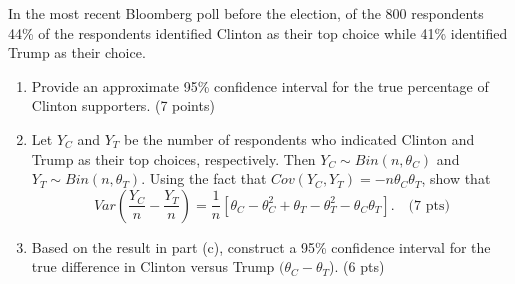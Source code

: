 

\item In the most recent Bloomberg poll before the election, of the 800 
respondents 44\% of the respondents identified Clinton as their top choice 
while 41\% identified Trump as their choice. 

\begin{enumerate}
\item Provide an approximate 95\% confidence interval for the true percentage of 
Clinton supporters. (7 points)

\vfill
% 
% 

\item Let $Y_C$ and $Y_T$ be the number of respondents who indicated Clinton 
and Trump as their top choices, respectively. Then $Y_C \sim Bin(n,\theta_C)$ 
and $Y_T \sim Bin(n,\theta_T)$. Using the fact that 
$Cov(Y_C,Y_T) = -n\theta_C \theta_T$, show that 
\[
Var\left( \frac{Y_C}{n} - \frac{Y_T}{n}\right) = 
\frac{1}{n}\left[ \theta_C - \theta_C^2 + \theta_T-\theta_T^2 - \theta_C\theta_T \right]. \quad \mbox{(7 pts)}
\]


\vfill

\item Based on the result in part (c), construct a 95\% confidence interval for 
the true difference in Clinton versus Trump $(\theta_C-\theta_T$). (6 pts)

\ansfont{
\[ 
\hat{\theta}_C - \hat{\theta}_T \pm z_{a/2} \sqrt{\frac{1}{n}\left[ \hat\theta_C - \hat\theta_C^2 + \hat\theta_T-\hat\theta_T^2 - \hat\theta_C\theta_T \right]} =
0.44 - 0.41 \pm 1.96 \sqrt{\frac{1}{800}\left[ 0.44 - 0.44^2 + 0.41-0.41^2 - 0.44\cdot0.41 \right]} = (-0.008, 0.068)
\]
}
\vfill

\end{enumerate}
